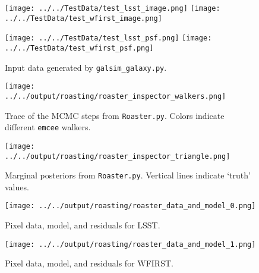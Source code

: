 \documentclass[11pt, letterpaper]{article}
\begin{document}




\begin{figure}
  \centerline{
    \texttt{[image: ../../TestData/test\_lsst\_image.png]}
    \texttt{[image: ../../TestData/test\_wfirst\_image.png]}
  }
  \centerline{
    \texttt{[image: ../../TestData/test\_lsst\_psf.png]}
    \texttt{[image: ../../TestData/test\_wfirst\_psf.png]}
  }
  \caption{Input data generated by \texttt{galsim\_galaxy.py}.}
  \label{fig:input_data}
\end{figure}


\begin{figure}
  \centerline{
    \texttt{[image: ../../output/roasting/roaster\_inspector\_walkers.png]}
  }
  \caption{Trace of the MCMC steps from \texttt{Roaster.py}. Colors indicate
  different \texttt{emcee} walkers.}
\end{figure}


\begin{figure}
  \centerline{
    \texttt{[image: ../../output/roasting/roaster\_inspector\_triangle.png]}
  }
  \caption{Marginal posteriors from \texttt{Roaster.py}. Vertical lines indicate
  `truth' values.}
\end{figure}

\begin{figure}
  \centerline{
    \texttt{[image: ../../output/roasting/roaster\_data\_and\_model\_0.png]}
  }
  \caption{Pixel data, model, and residuals for LSST.}
\end{figure}

\begin{figure}
  \centerline{
    \texttt{[image: ../../output/roasting/roaster\_data\_and\_model\_1.png]}
  }
  \caption{Pixel data, model, and residuals for WFIRST.}
\end{figure}
\end{document}
